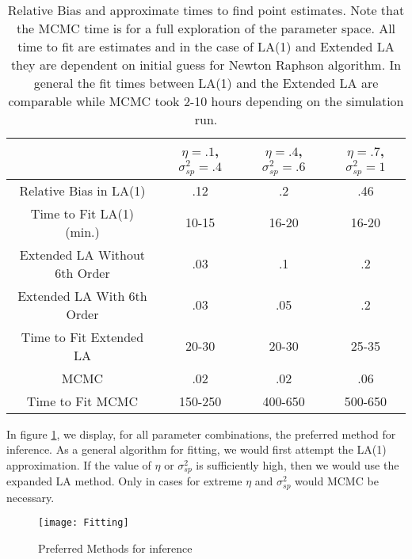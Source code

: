\documentclass[11pt]{isuthesis}
\begin{document}
	\begin{table}[h]
		\begin{center}
			\begin{tabular}{ |c|c|c|c| } 
				\hline
				& $\eta=.1$, $\sigma_{sp}^2=.4$&$\eta=.4$, $\sigma_{sp}^2=.6$& $\eta=.7$, $\sigma_{sp}^2=1$\\
				\hline
				Relative Bias in LA(1) & .12 & .2 & .46\\ 
				Time to Fit LA(1) (min.)& 10-15 & 16-20 & 16-20\\
				\hline
				Extended LA Without 6th Order & .03 & .1 & .2\\
				Extended LA With 6th Order& .03 & .05 & .2\\
				Time to Fit Extended LA & 20-30 & 20-30 &  25-35\\
				\hline
				MCMC & .02 & .02 & .06\\
				Time to Fit MCMC & 150-250 & 400-650 & 500-650\\
				\hline
			\end{tabular}
		\end{center}
		\caption{Relative Bias and approximate times to find point estimates.  Note that the MCMC time is for a full exploration of the parameter space.  All time to fit are estimates and in the case of LA(1) and Extended LA they are dependent on initial guess for Newton Raphson algorithm.  In general the fit times between LA(1) and the Extended LA are comparable while MCMC took 2-10 hours depending on the simulation run.}\label{Simulations}
	\end{table}
	
	In figure \ref{fig:Fitting}, we display, for all parameter combinations, the preferred method for inference.  As a general algorithm for fitting, we would first attempt the LA(1) approximation.  If the value of $\eta$ or $\sigma_{sp}^2$ is sufficiently high, then we would use the expanded LA method.  Only in cases for extreme $\eta$ and $\sigma_{sp}^2$ would MCMC be necessary.
	
	
	
	\begin{figure}[!htp]
		\centering
		\texttt{[image: Fitting]}
		\caption{Preferred Methods for inference }\label{fig:Fitting}
	\end{figure}
	
\end{document}
